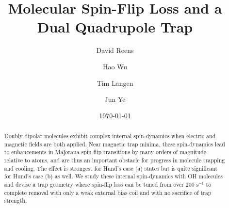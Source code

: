 \documentclass[%
 reprint,
groupedaddress,
 amsmath,amssymb,
 aps,
prl,
]{revtex4-1}
\begin{document}

\title{Molecular Spin-Flip Loss and a Dual Quadrupole Trap}%

\author{David Reens}
%
\author{Hao Wu}
\author{Tim Langen}%
\author{Jun Ye}
%

\date{\today}%


\begin{abstract}
Doubly dipolar molecules exhibit complex internal spin-dynamics when electric and magnetic fields are both applied. Near magnetic trap minima, these spin-dynamics lead to enhancements in Majorana spin-flip transitions by many orders of magnitude relative to atoms, and are thus an important obstacle for progress in molecule trapping and cooling. The effect is strongest for Hund's case (a) states but is quite significant for Hund's case (b) as well. We study these internal spin-dynamics with OH molecules and devise a trap geometry where spin-flip loss can be tuned from over $200 \text{ s}^{-1} $ to complete removal with only a weak external bias coil and with no sacrifice of trap strength.
\end{abstract}


\maketitle
\end{document}
